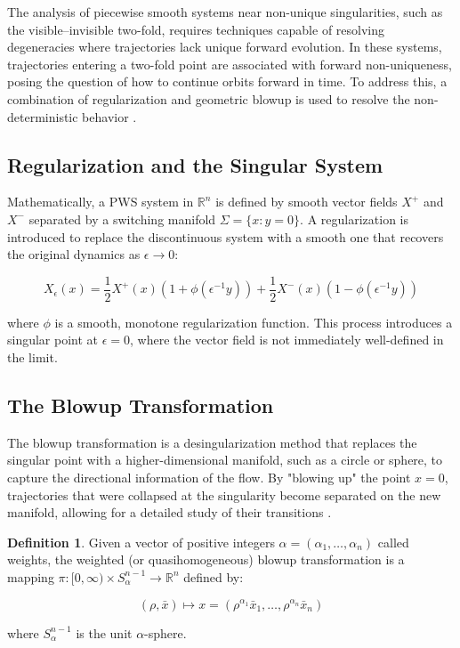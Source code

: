 \documentclass[12pt, a4paper, oneside]{book}
\theoremstyle{plain}
\theoremstyle{definition}
\newtheorem{definition}[theorem]{Definition}
\theoremstyle{remark}
\theoremstyle{definition}
\begin{document}
The analysis of piecewise smooth systems near non-unique singularities, such as the visible–invisible two-fold, requires techniques capable of resolving degeneracies where trajectories lack unique forward evolution. In these systems, trajectories entering a two-fold point are associated with forward non-uniqueness, posing the question of how to continue orbits forward in time. To address this, a combination of regularization and geometric blowup is used to resolve the non-deterministic behavior \cite{kristiansen2019resolution}.

\subsection{Regularization and the Singular System}

Mathematically, a PWS system in $\mathbb{R}^n$ is defined by smooth vector fields $X^+$ and $X^-$ separated by a switching manifold $\Sigma = \{x : y = 0\}$. A regularization is introduced to replace the discontinuous system with a smooth one that recovers the original dynamics as $\epsilon \to 0$:

\begin{equation}
    X_\epsilon(x) = \frac{1}{2}X^+(x)(1 + \phi(\epsilon^{-1}y)) + \frac{1}{2}X^-(x)(1 - \phi(\epsilon^{-1}y))
\end{equation}

where $\phi$ is a smooth, monotone regularization function. This process introduces a singular point at $\epsilon = 0$, where the vector field is not immediately well-defined in the limit.

\subsection{The Blowup Transformation}

The blowup transformation is a desingularization method that replaces the singular point with a higher-dimensional manifold, such as a circle or sphere, to capture the directional information of the flow. By "blowing up" the point $x=0$, trajectories that were collapsed at the singularity become separated on the new manifold, allowing for a detailed study of their transitions \cite{kristiansen2019resolution}.

\begin{definition}
Given a vector of positive integers $\alpha = (\alpha_1, \dots, \alpha_n)$ called weights, the weighted (or quasihomogeneous) blowup transformation is a mapping $\pi: [0, \infty) \times S^{n-1}_{\alpha} \to \mathbb{R}^n$ defined by:

\begin{equation}
    (\rho, \bar{x}) \mapsto x = (\rho^{\alpha_1} \bar{x}_1, \dots, \rho^{\alpha_n} \bar{x}_n)
\end{equation}

where $S^{n-1}_{\alpha}$ is the unit $\alpha$-sphere.
\end{definition}
\end{document}
